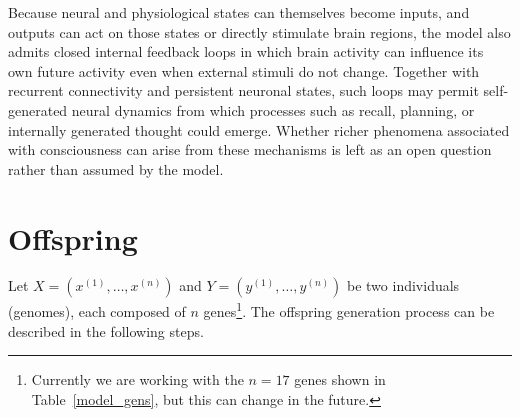 \documentclass[12pt,a4paper]{article}
\begin{document}
	Because neural and physiological states can themselves become inputs, and outputs can act on those states or directly stimulate brain regions, the model also admits closed internal feedback loops in which brain activity can influence its own future activity even when external stimuli do not change. Together with recurrent connectivity and persistent neuronal states, such loops may permit self-generated neural dynamics from which processes such as recall, planning, or internally generated thought could emerge. Whether richer phenomena associated with consciousness can arise from these mechanisms is left as an open question rather than assumed by the model.

\section{Offspring}

	Let $X = (x^{(1)}, \ldots, x^{(n)})$ and $Y = (y^{(1)}, \ldots, y^{(n)})$ be two individuals (genomes), each composed of $n$ genes\footnote{Currently we are working with the $n = 17$ genes shown in Table~\ref{model_gens}, but this can change in the future.}. The offspring generation process can be described in the following steps.
	
\end{document}
